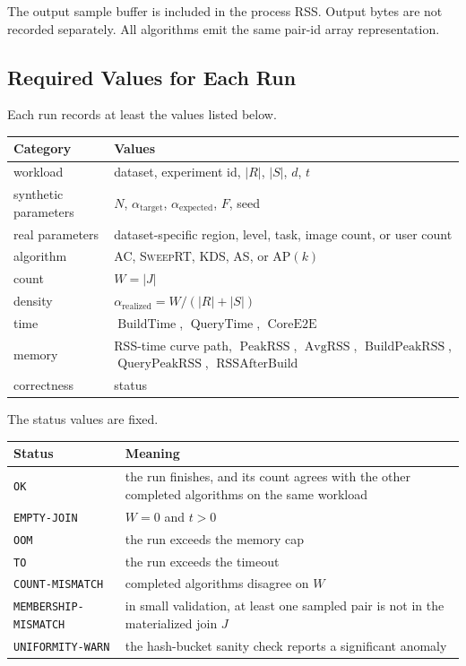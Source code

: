 \documentclass[11pt]{article}
\newcommand{\AC}{\textsc{AC}}
\newcommand{\AS}{\textsc{AS}}
\newcommand{\AP}{\textsc{AP}}
\newcommand{\SweepRT}{\textsc{SweepRT}}
\newcommand{\KDS}{\textsc{KDS}}
\newcommand{\BuildTime}{\ensuremath{\operatorname{BuildTime}}}
\newcommand{\QueryTime}{\ensuremath{\operatorname{QueryTime}}}
\newcommand{\CoreE}{\ensuremath{\operatorname{CoreE2E}}}
\newcommand{\PeakRSS}{\ensuremath{\operatorname{PeakRSS}}}
\newcommand{\AvgRSS}{\ensuremath{\operatorname{AvgRSS}}}
\newcommand{\BuildPeakRSS}{\ensuremath{\operatorname{BuildPeakRSS}}}
\newcommand{\QueryPeakRSS}{\ensuremath{\operatorname{QueryPeakRSS}}}
\newcommand{\RSSAfterBuild}{\ensuremath{\operatorname{RSSAfterBuild}}}
\newcommand{\status}[1]{\texttt{#1}}
\begin{document}
The output sample buffer is included in the process RSS.  Output bytes are not recorded separately.  All algorithms emit the same pair-id array representation.

\subsection{Required Values for Each Run}
Each run records at least the values listed below.

\begin{center}
\small
\begin{tabularx}{\linewidth}{@{}lY@{}}
\toprule
Category & Values \\
\midrule
workload & dataset, experiment id, $|R|$, $|S|$, $d$, $t$ \\
synthetic parameters & $N$, $\alpha_{\mathrm{target}}$, $\alpha_{\mathrm{expected}}$, $F$, seed \\
real parameters & dataset-specific region, level, task, image count, or user count \\
algorithm & \AC, \SweepRT, \KDS, \AS, or \AP$(k)$ \\
count & $W=|J|$ \\
density & $\alpha_{\mathrm{realized}}=W/(|R|+|S|)$ \\
time & \BuildTime, \QueryTime, \CoreE{} \\
memory & RSS-time curve path, \PeakRSS, \AvgRSS, \BuildPeakRSS, \QueryPeakRSS, \RSSAfterBuild{} \\
correctness & status \\
\bottomrule
\end{tabularx}
\end{center}

The status values are fixed.

\begin{center}
\begin{tabularx}{\linewidth}{@{}lY@{}}
\toprule
Status & Meaning \\
\midrule
\status{OK} & the run finishes, and its count agrees with the other completed algorithms on the same workload \\
\status{EMPTY-JOIN} & $W=0$ and $t>0$ \\
\status{OOM} & the run exceeds the memory cap \\
\status{TO} & the run exceeds the timeout \\
\status{COUNT-MISMATCH} & completed algorithms disagree on $W$ \\
\status{MEMBERSHIP-MISMATCH} & in small validation, at least one sampled pair is not in the materialized join $J$ \\
\status{UNIFORMITY-WARN} & the hash-bucket sanity check reports a significant anomaly \\
\bottomrule
\end{tabularx}
\end{center}
\end{document}
